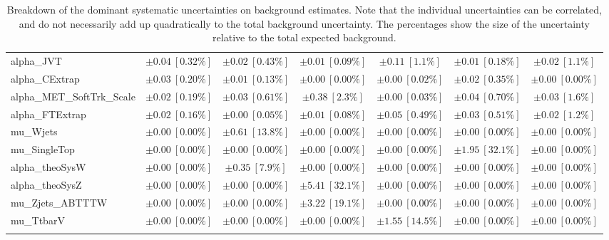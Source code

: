 \begin{sidewaystable}
\begin{center}
\begin{tabular*}{\textwidth}{@{\extracolsep{\fill}}lcccccc}
alpha\_JVT         & $\pm 0.04\ [0.32\%] $          & $\pm 0.02\ [0.43\%] $          & $\pm 0.01\ [0.09\%] $          & $\pm 0.11\ [1.1\%] $          & $\pm 0.01\ [0.18\%] $          & $\pm 0.02\ [1.1\%] $       \\
alpha\_CExtrap         & $\pm 0.03\ [0.20\%] $          & $\pm 0.01\ [0.13\%] $          & $\pm 0.00\ [0.00\%] $          & $\pm 0.00\ [0.02\%] $          & $\pm 0.02\ [0.35\%] $          & $\pm 0.00\ [0.00\%] $       \\
alpha\_MET\_SoftTrk\_Scale         & $\pm 0.02\ [0.19\%] $          & $\pm 0.03\ [0.61\%] $          & $\pm 0.38\ [2.3\%] $          & $\pm 0.00\ [0.03\%] $          & $\pm 0.04\ [0.70\%] $          & $\pm 0.03\ [1.6\%] $       \\
alpha\_FTExtrap         & $\pm 0.02\ [0.16\%] $          & $\pm 0.00\ [0.05\%] $          & $\pm 0.01\ [0.08\%] $          & $\pm 0.05\ [0.49\%] $          & $\pm 0.03\ [0.51\%] $          & $\pm 0.02\ [1.2\%] $       \\
mu\_Wjets         & $\pm 0.00\ [0.00\%] $          & $\pm 0.61\ [13.8\%] $          & $\pm 0.00\ [0.00\%] $          & $\pm 0.00\ [0.00\%] $          & $\pm 0.00\ [0.00\%] $          & $\pm 0.00\ [0.00\%] $       \\
mu\_SingleTop         & $\pm 0.00\ [0.00\%] $          & $\pm 0.00\ [0.00\%] $          & $\pm 0.00\ [0.00\%] $          & $\pm 0.00\ [0.00\%] $          & $\pm 1.95\ [32.1\%] $          & $\pm 0.00\ [0.00\%] $       \\
alpha\_theoSysW         & $\pm 0.00\ [0.00\%] $          & $\pm 0.35\ [7.9\%] $          & $\pm 0.00\ [0.00\%] $          & $\pm 0.00\ [0.00\%] $          & $\pm 0.00\ [0.00\%] $          & $\pm 0.00\ [0.00\%] $       \\
alpha\_theoSysZ         & $\pm 0.00\ [0.00\%] $          & $\pm 0.00\ [0.00\%] $          & $\pm 5.41\ [32.1\%] $          & $\pm 0.00\ [0.00\%] $          & $\pm 0.00\ [0.00\%] $          & $\pm 0.00\ [0.00\%] $       \\
mu\_Zjets\_ABTTTW         & $\pm 0.00\ [0.00\%] $          & $\pm 0.00\ [0.00\%] $          & $\pm 3.22\ [19.1\%] $          & $\pm 0.00\ [0.00\%] $          & $\pm 0.00\ [0.00\%] $          & $\pm 0.00\ [0.00\%] $       \\
mu\_TtbarV         & $\pm 0.00\ [0.00\%] $          & $\pm 0.00\ [0.00\%] $          & $\pm 0.00\ [0.00\%] $          & $\pm 1.55\ [14.5\%] $          & $\pm 0.00\ [0.00\%] $          & $\pm 0.00\ [0.00\%] $       \\
\noalign{\smallskip}\hline\noalign{\smallskip}
\end{tabular*}
\end{center}
\caption[Breakdown of uncertainty on background estimates]{
Breakdown of the dominant systematic uncertainties on background estimates.
Note that the individual uncertainties can be correlated, and do not necessarily add up quadratically to 
the total background uncertainty. The percentages show the size of the uncertainty relative to the total expected background.
\label{table.results.bkgestimate.uncertainties.SRB_TW_bybkg}}
\end{sidewaystable}
%
